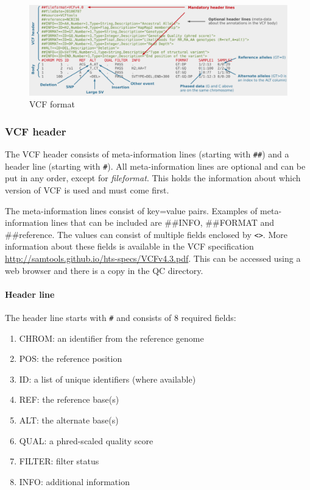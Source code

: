 \documentclass[11pt]{article}
\providecommand{\tightlist}{%
      \setlength{\itemsep}{0pt}\setlength{\parskip}{0pt}}
\begin{document}
    \begin{figure}[!h]
\centering
\includegraphics{img/VCF1.png}
\caption{VCF format}
\end{figure}

    \hypertarget{vcf-header}{%
\subsubsection{VCF header}\label{vcf-header}}

The VCF header consists of meta-information lines (starting with
\texttt{\#\#}) and a header line (starting with \texttt{\#}). All
meta-information lines are optional and can be put in any order, except
for \textit{fileformat}. This holds the information about which version of
VCF is used and must come first.

The meta-information lines consist of key=value pairs. Examples of
meta-information lines that can be included are \#\#INFO, \#\#FORMAT and
\#\#reference. The values can consist of multiple fields enclosed by
\texttt{\textless{}\textgreater{}}. More information about these fields
is available in the VCF specification
\url{http://samtools.github.io/hts-specs/VCFv4.3.pdf}. This can be
accessed using a web browser and there is a copy in the QC directory.

\hypertarget{header-line}{%
\paragraph{Header line}\label{header-line}}

The header line starts with \texttt{\#} and consists of 8 required
fields:

\begin{enumerate}
\def\labelenumi{\arabic{enumi}.}
\tightlist
\item
  CHROM: an identifier from the reference genome
\item
  POS: the reference position
\item
  ID: a list of unique identifiers (where available)
\item
  REF: the reference base(s)
\item
  ALT: the alternate base(s)
\item
  QUAL: a phred-scaled quality score
\item
  FILTER: filter status
\item
  INFO: additional information
\end{enumerate}
\end{document}
